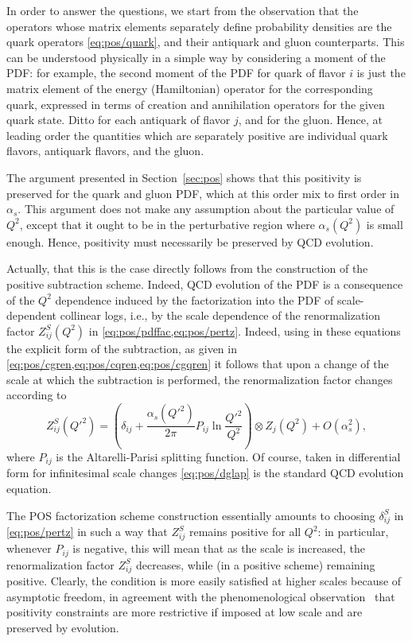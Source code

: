 In order to answer the questions, we start from the observation that
the operators whose matrix elements separately define probability densities are
the quark operators \cref{eq:pos/quark}, and their antiquark and gluon
counterparts. This can be understood physically in a simple way by
considering a moment of the PDF: for example, the second moment of the
PDF for quark of flavor $i$ is just the matrix element of the energy
(Hamiltonian) operator for the corresponding quark, expressed in terms
of creation and annihilation operators for the given quark state.
Ditto for each antiquark of
flavor $j$, and for the gluon. Hence, at leading order the quantities
which are separately positive are individual quark flavors, antiquark
flavors, and the gluon.

The argument presented in Section~\ref{sec:pos} shows that this
positivity is preserved for the quark and gluon PDF, which at this
order mix to first order in $\alpha_s$. This argument does not make
any assumption about the particular value of $Q^2$, except that it
ought to be in the perturbative region where $\alpha_s(Q^2)$ is small
enough. Hence, positivity must necessarily be preserved by QCD
evolution.

Actually,  that this is the case directly follows from the construction of the
positive subtraction scheme.
Indeed, QCD evolution of the PDF is a consequence of the $Q^2$
dependence induced by the factorization into the PDF of
scale-dependent collinear logs, i.e., by the scale dependence of the
renormalization factor $Z^S_{ij}(Q^2)$ in
\cref{eq:pos/pdffac,eq:pos/pertz}. 
Indeed, using in these equations the explicit form of the subtraction, as given
in \cref{eq:pos/cgren,eq:pos/cqren,eq:pos/cgqren} it follows that upon a change
of the scale at which the subtraction is performed, the renormalization factor
changes according to
\begin{equation}\label{eq:pos/dglap}
  Z^S_{ij}({Q'}^2)=\left(\delta_{ij}+\frac{\alpha_s({Q'}^2)}{2\pi}P_{ij}\ln\frac{{Q'}^2}{Q^2}\right)\otimes
  Z_j(Q^2) +O(\alpha_s^2),
\end{equation}
where $P_{ij}$ is the Altarelli-Parisi splitting function. Of course,
taken in differential form for infinitesimal scale changes
\cref{eq:pos/dglap} is the standard QCD evolution equation.

The POS factorization scheme construction essentially amounts to
choosing $\delta^{S}_{ij}$ in \cref{eq:pos/pertz} in  such a way that
$Z_{ij}^{S}$ remains positive for all $Q^2$: in particular, whenever
$P_{ij}$ is negative, this will mean that as the scale is increased,
the renormalization factor $Z_{ij}^S$ decreases, while (in a positive
scheme) remaining positive. Clearly, the condition is more easily
satisfied at higher scales because of asymptotic freedom, in agreement
with the phenomenological observation~\cite{Ball:2010de,Ball:2014uwa}
that positivity constraints are more restrictive if imposed at low
scale and are preserved by evolution.

